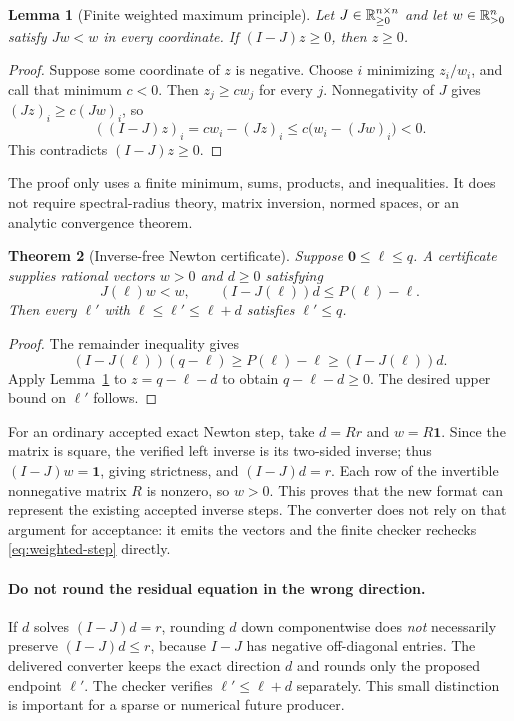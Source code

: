 \documentclass[11pt,a4paper]{article}
\newtheorem{theorem}{Theorem}[section]
\newtheorem{lemma}[theorem]{Lemma}
\theoremstyle{definition}\newtheorem{definition}[theorem]{Definition}
\theoremstyle{remark}\newtheorem{remark}[theorem]{Remark}
\newcommand{\one}{\mathbf 1}\newcommand{\zero}{\mathbf 0}
\begin{document}
\begin{lemma}[Finite weighted maximum principle]
\label{lem:maximum}
Let $J\in\mathbb R_{\ge0}^{n\times n}$ and let $w\in\mathbb R_{>0}^n$ satisfy $Jw<w$ in every coordinate. If $(I-J)z\ge0$, then $z\ge0$.
\end{lemma}
\begin{proof}
Suppose some coordinate of $z$ is negative. Choose $i$ minimizing $z_i/w_i$, and call that minimum $c<0$. Then $z_j\ge cw_j$ for every $j$. Nonnegativity of $J$ gives $(Jz)_i\ge c(Jw)_i$, so
\[
 ((I-J)z)_i
 =cw_i-(Jz)_i
 \le c\bigl(w_i-(Jw)_i\bigr)<0.
\]
This contradicts $(I-J)z\ge0$.
\end{proof}

The proof only uses a finite minimum, sums, products, and inequalities. It does not require spectral-radius theory, matrix inversion, normed spaces, or an analytic convergence theorem.

\begin{theorem}[Inverse-free Newton certificate]
\label{thm:weighted-newton}
Suppose $\zero\le\ell\le q$. A certificate supplies rational vectors $w>0$ and $d\ge0$ satisfying
\begin{equation}
 \label{eq:weighted-step}
 J(\ell)w<w,
 \qquad (I-J(\ell))d\le P(\ell)-\ell.
\end{equation}
Then every $\ell'$ with $\ell\le\ell'\le\ell+d$ satisfies $\ell'\le q$.
\end{theorem}
\begin{proof}
The remainder inequality gives
\[
 (I-J(\ell))(q-\ell)\ge P(\ell)-\ell
 \ge (I-J(\ell))d.
\]
Apply Lemma~\ref{lem:maximum} to $z=q-\ell-d$ to obtain $q-\ell-d\ge0$. The desired upper bound on $\ell'$ follows.
\end{proof}

For an ordinary accepted exact Newton step, take $d=Rr$ and $w=R\one$. Since the matrix is square, the verified left inverse is its two-sided inverse; thus $(I-J)w=\one$, giving strictness, and $(I-J)d=r$. Each row of the invertible nonnegative matrix $R$ is nonzero, so $w>0$. This proves that the new format can represent the existing accepted inverse steps. The converter does not rely on that argument for acceptance: it emits the vectors and the finite checker rechecks \eqref{eq:weighted-step} directly.

\paragraph{Do not round the residual equation in the wrong direction.}
If $d$ solves $(I-J)d=r$, rounding $d$ down componentwise does \emph{not} necessarily preserve $(I-J)d\le r$, because $I-J$ has negative off-diagonal entries. The delivered converter keeps the exact direction $d$ and rounds only the proposed endpoint $\ell'$. The checker verifies $\ell'\le\ell+d$ separately. This small distinction is important for a sparse or numerical future producer.
\end{document}
